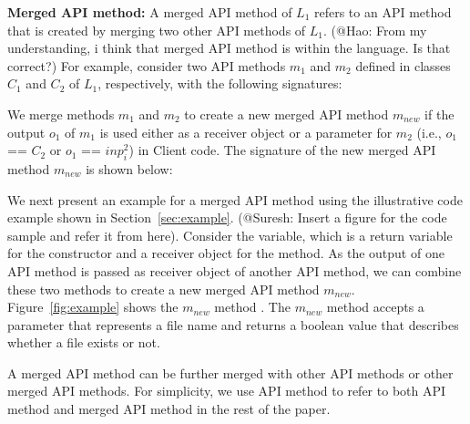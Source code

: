 \textbf{Merged API method:} A merged API method of $L_1$ refers to an API method
that is created by merging two other API methods of $L_1$. (@Hao: From my
understanding, i think that merged API method is within the language. Is that correct?)
For example, consider two API methods $m_1$ and $m_2$ defined in classes
$C_1$ and $C_2$ of $L_1$, respectively, with the
following signatures:



We merge methods $m_1$ and $m_2$ to create a new merged API method $m_{new}$ if the
output $o_1$ of $m_1$ is used either as a receiver object or a
parameter for $m_2$ (i.e., $o_1$ == $C_2$ or $o_1$ == $inp_i^2$)
in Client code. The signature of the new merged API method $m_{new}$ is
shown below:


We next present an example for a merged API method using the
illustrative code example shown in Section~\ref{sec:example}. (@Suresh:
Insert a figure for the code sample and refer it from here).
Consider the  variable, which is a return variable
for the constructor and a receiver object for the  method.
As the output of one API method is passed as receiver object of
another API method, we can combine these two methods to create a new
merged API method $m_{new}$. Figure~\ref{fig:example} shows
the $m_{new}$ method . The $m_{new}$
method accepts a  parameter that represents a file name
and returns a boolean value that describes whether a file exists or not.

A merged API method can be further merged with other API methods or
other merged API methods. For simplicity, we use API method to refer
to both API method and merged API method in the rest of the paper.

